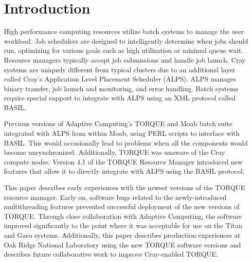 \section{Introduction}

High performance computing resources utilize batch systems to manage the user
workload. Job schedulers are designed to intelligently determine when jobs
should run, optimizing for various goals such as high utilization or minimal
queue wait. Resource managers typically accept job submissions and handle job
launch. Cray systems are uniquely different from typical clusters due to an
additional layer called Cray's Application Level Placement Scheduler (ALPS).
ALPS manages binary transfer, job launch and monitoring, and error handling.
Batch systems require special support to integrate with ALPS using an XML
protocol called BASIL.

Previous versions of Adaptive Computing's TORQUE and Moab batch suite
integrated with ALPS from within Moab, using PERL scripts to interface with
BASIL. This would occasionally lead to problems when all the components would
become unsynchronized. Additionally, TORQUE was unaware of the Cray compute
nodes. Version 4.1 of the TORQUE Resource Manager introduced new features that
allow it to directly integrate with ALPS using the BASIL protocol.

This paper describes early experiences with the newest versions of the TORQUE
resource manager. Early on, software bugs related to the newly-introduced
multithreading features prevented successful deployment of the new versions of
TORQUE. Through close collaboration with Adaptive Computing, the software
improved significantly to the point where it was acceptable for use on the
Titan and Gaea systems. Additionally, this paper describes production
experiences at Oak Ridge National Laboratory using the new TORQUE software
versions and describes future collaborative work to improve Cray-enabled
TORQUE.
